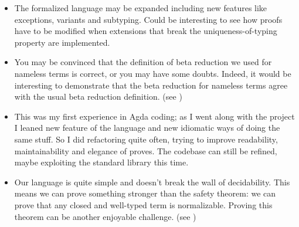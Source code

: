\documentclass{article}
\begin{document}
\begin{itemize}
  \item
  The formalized language may be expanded including new features like exceptions, variants and subtyping.
  Could be interesting to see how proofs have to be modified when extensions that break the uniqueness-of-typing property are implemented.
  
  \item
  You may be convinced that the definition of beta reduction we used for nameless terms is correct, or you may have some doubts.
  Indeed, it would be interesting to demonstrate that the beta reduction for nameless terms agree with the usual beta reduction definition.
  (see \cite[Ex.\ 6.2.8]{pierce})
  
  \item
  This was my first experience in Agda coding; as I went along with the project I leaned new feature of the language and new idiomatic ways of doing the same stuff.
  So I did refactoring quite often, trying to improve readability, maintainability and elegance of proves.
  The codebase can still be refined, maybe exploiting the standard library this time.
  
  \item
  Our language is quite simple and doesn't break the wall of decidability.
  This means we can prove something stronger than the safety theorem: we can prove that any closed and well-typed term is normalizable.
  Proving this theorem can be another enjoyable challenge.
  (see \cite[Ch.\ 12]{pierce})
  
\end{itemize}



\newpage
\nocite{*}
\printbibliography
\end{document}
